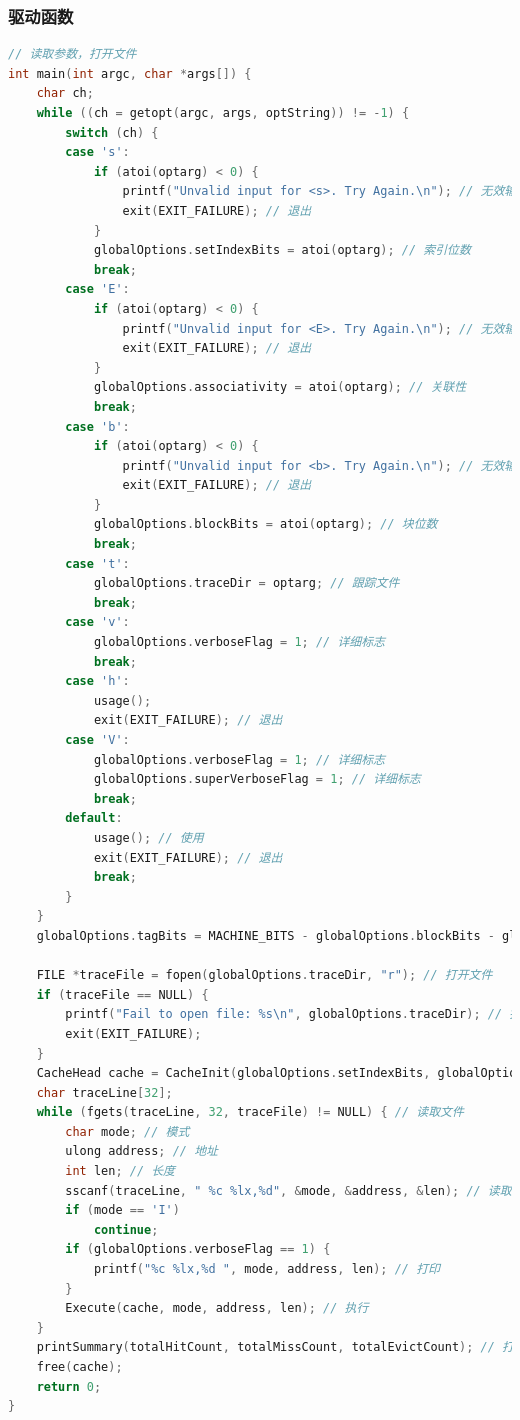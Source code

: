 \subsubsection{驱动函数}
\begin{lstlisting}[language = C , title = {Main} ]
// 读取参数，打开文件
int main(int argc, char *args[]) {
	char ch;
	while ((ch = getopt(argc, args, optString)) != -1) {
		switch (ch) {
		case 's':
			if (atoi(optarg) < 0) {
				printf("Unvalid input for <s>. Try Again.\n"); // 无效输入
				exit(EXIT_FAILURE); // 退出
			}
			globalOptions.setIndexBits = atoi(optarg); // 索引位数
			break;
		case 'E':
			if (atoi(optarg) < 0) {
				printf("Unvalid input for <E>. Try Again.\n"); // 无效输入
				exit(EXIT_FAILURE); // 退出
			}
			globalOptions.associativity = atoi(optarg); // 关联性
			break;
		case 'b':
			if (atoi(optarg) < 0) {
				printf("Unvalid input for <b>. Try Again.\n"); // 无效输入
				exit(EXIT_FAILURE); // 退出
			}
			globalOptions.blockBits = atoi(optarg); // 块位数
			break;
		case 't':
			globalOptions.traceDir = optarg; // 跟踪文件
			break; 
		case 'v':
			globalOptions.verboseFlag = 1; // 详细标志
			break;
		case 'h':
			usage();
			exit(EXIT_FAILURE); // 退出
		case 'V':
			globalOptions.verboseFlag = 1; // 详细标志
			globalOptions.superVerboseFlag = 1; // 详细标志
			break;
		default:
			usage(); // 使用
			exit(EXIT_FAILURE); // 退出
			break;
		}
	}
	globalOptions.tagBits = MACHINE_BITS - globalOptions.blockBits - globalOptions.setIndexBits; // 标志位

	FILE *traceFile = fopen(globalOptions.traceDir, "r"); // 打开文件
	if (traceFile == NULL) {
		printf("Fail to open file: %s\n", globalOptions.traceDir); // 打开文件失败
		exit(EXIT_FAILURE);
	}
	CacheHead cache = CacheInit(globalOptions.setIndexBits, globalOptions.associativity); // 初始化
	char traceLine[32];
	while (fgets(traceLine, 32, traceFile) != NULL) { // 读取文件
		char mode; // 模式
		ulong address; // 地址
		int len; // 长度
		sscanf(traceLine, " %c %lx,%d", &mode, &address, &len); // 读取
		if (mode == 'I')
			continue;
		if (globalOptions.verboseFlag == 1) {
			printf("%c %lx,%d ", mode, address, len); // 打印
		}
		Execute(cache, mode, address, len); // 执行
	}
	printSummary(totalHitCount, totalMissCount, totalEvictCount); // 打印结果
	free(cache);
	return 0;
}
\end{lstlisting}


